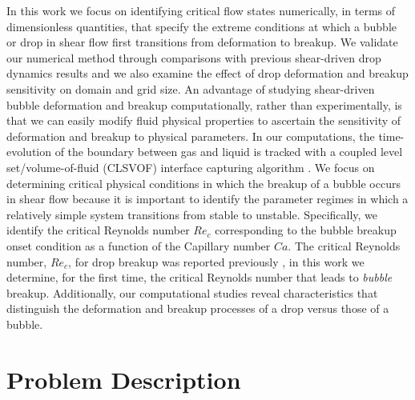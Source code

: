 \documentclass[%
 reprint,
 showkeys,
 amsmath,amssymb,
 aps,
 prfluids,
 onecolumn
]{revtex4-2}
\begin{document}
In this work we focus on identifying critical flow states numerically, in terms
of dimensionless quantities, that specify the extreme conditions at which a
bubble or drop in shear flow first transitions from deformation to breakup.
We validate our numerical method through comparisons with previous
shear-driven drop dynamics results and we also examine the effect of drop
deformation and breakup sensitivity on domain and grid size.  An advantage of
studying shear-driven bubble deformation and breakup computationally, rather
than experimentally, is that we can easily modify fluid physical properties to
ascertain the sensitivity of deformation and breakup to physical parameters.
In our computations, the time-evolution of the boundary between gas and liquid
is tracked with a coupled level set/volume-of-fluid (CLSVOF) interface
capturing algorithm \cite{SusPuc00}.  We focus on determining critical physical
conditions in which the breakup of a bubble occurs in shear flow because it is
important to identify the parameter regimes in which a relatively simple system
transitions from stable to unstable.  Specifically, we identify the critical
Reynolds number $Re_{c}$ corresponding to the bubble breakup onset condition as
a function of the Capillary number $Ca$.  The critical Reynolds number, 
$Re_{c}$, for drop
breakup was reported previously \cite{LiRenRen00}, in this work we determine,
for the first time, the critical Reynolds number that leads to \emph{bubble}
breakup.  Additionally, our computational studies reveal characteristics that
distinguish the deformation and breakup processes of a drop versus those of a
bubble.


\section{Problem Description}
\end{document}

